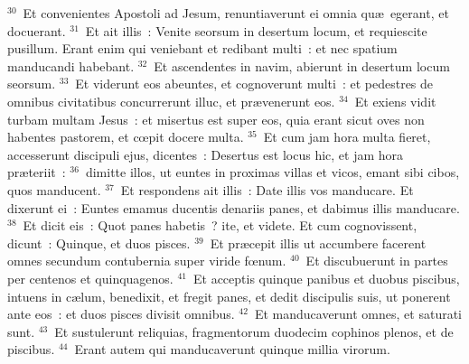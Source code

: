 ${}^{30}$~Et convenientes Apostoli ad Jesum, renuntiaverunt ei omnia qu\ae\ egerant, et docuerant.
${}^{31}$~Et ait illis~: Venite seorsum in desertum locum, et requiescite pusillum. Erant enim qui veniebant et redibant multi~: et nec spatium manducandi habebant.
${}^{32}$~Et ascendentes in navim, abierunt in desertum locum seorsum.
${}^{33}$~Et viderunt eos abeuntes, et cognoverunt multi~: et pedestres de omnibus civitatibus concurrerunt illuc, et pr\ae venerunt eos.
${}^{34}$~Et exiens vidit turbam multam Jesus~: et misertus est super eos, quia erant sicut oves non habentes pastorem, et cœpit docere multa.
${}^{35}$~Et cum jam hora multa fieret, accesserunt discipuli ejus, dicentes~: Desertus est locus hic, et jam hora pr\ae teriit~:
${}^{36}$~dimitte illos, ut euntes in proximas villas et vicos, emant sibi cibos, quos manducent.
${}^{37}$~Et respondens ait illis~: Date illis vos manducare. Et dixerunt ei~: Euntes emamus ducentis denariis panes, et dabimus illis manducare.
${}^{38}$~Et dicit eis~: Quot panes habetis~? ite, et videte. Et cum cognovissent, dicunt~: Quinque, et duos pisces.
${}^{39}$~Et pr\ae cepit illis ut accumbere facerent omnes secundum contubernia super viride fœnum.
${}^{40}$~Et discubuerunt in partes per centenos et quinquagenos.
${}^{41}$~Et acceptis quinque panibus et duobus piscibus, intuens in c\ae lum, benedixit, et fregit panes, et dedit discipulis suis, ut ponerent ante eos~: et duos pisces divisit omnibus.
${}^{42}$~Et manducaverunt omnes, et saturati sunt.
${}^{43}$~Et sustulerunt reliquias, fragmentorum duodecim cophinos plenos, et de piscibus.
${}^{44}$~Erant autem qui manducaverunt quinque millia virorum.


